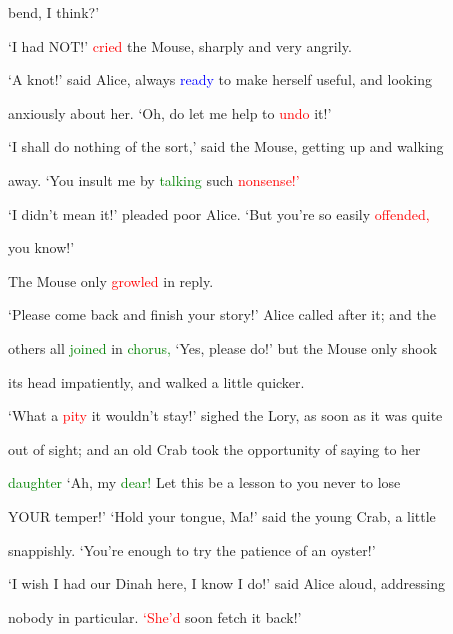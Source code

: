  bend, I think?’



 ‘I had NOT!’ \textcolor{red}{cried} the Mouse, sharply and very angrily.



 ‘A knot!’ said Alice, always \textcolor{blue}{ready} to make herself useful, and looking

 anxiously about her. ‘Oh, do let me help to \textcolor{red}{undo} it!’



 ‘I shall do nothing of the sort,’ said the Mouse, getting up and walking

 away. ‘You \textcolor{BurntOrange}{insult} me by \textcolor{green}{talking} such \textcolor{red}{nonsense!’}



 ‘I didn’t mean it!’ pleaded poor Alice. ‘But you’re so easily \textcolor{red}{offended,}

 you know!’



 The Mouse only \textcolor{red}{growled} in reply.



 ‘Please come back and finish your story!’ Alice called after it; and the

 others all \textcolor{green}{joined} in \textcolor{green}{chorus,} ‘Yes, please do!’ but the Mouse only shook

 its head impatiently, and walked a little quicker.



 ‘What a \textcolor{red}{pity} it wouldn’t stay!’ sighed the Lory, as soon as it was quite

 out of sight; and an old Crab took the \textcolor{BurntOrange}{opportunity} of saying to her

 \textcolor{green}{daughter} ‘Ah, my \textcolor{green}{dear!} Let this be a \textcolor{BurntOrange}{lesson} to you never to \textcolor{BurntOrange}{lose}

 YOUR temper!’ ‘Hold your tongue, Ma!’ said the \textcolor{BurntOrange}{young} Crab, a little

 snappishly. ‘You’re enough to try the \textcolor{BurntOrange}{patience} of an oyster!’



 ‘I wish I had our Dinah here, I know I do!’ said Alice aloud, addressing

 nobody in particular. \textcolor{red}{‘She’d} soon fetch it back!’



